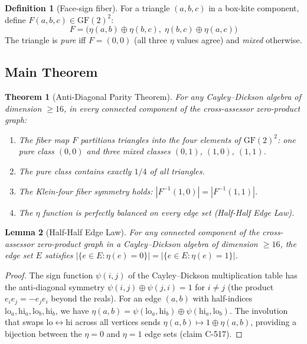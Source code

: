 \documentclass[12pt]{article}
\theoremstyle{definition}
\newtheorem{definition}{Definition}[section]
\theoremstyle{plain}
\newtheorem{theorem}{Theorem}[section]
\newtheorem{lemma}[theorem]{Lemma}
\theoremstyle{remark}
\begin{document}
\begin{definition}[Face-sign fiber]
For a triangle $(a,b,c)$ in a box-kite component, define
$F(a,b,c) \in \mathrm{GF}(2)^2$:
\begin{equation}
  F = \bigl(\eta(a,b) \oplus \eta(b,c),\;
            \eta(b,c) \oplus \eta(a,c)\bigr)
  \label{eq:fiber}
\end{equation}
The triangle is \emph{pure} iff $F = (0,0)$ (all three $\eta$ values agree)
and \emph{mixed} otherwise.
\end{definition}

\subsection{Main Theorem}
\label{sec:apt-main}

\begin{theorem}[Anti-Diagonal Parity Theorem]
\label{thm:apt}
For any Cayley--Dickson algebra of dimension $\geq 16$, in every connected
component of the cross-assessor zero-product graph:
\begin{enumerate}
  \item The fiber map $F$ partitions triangles into the four elements of
    $\mathrm{GF}(2)^2$: one pure class $(0,0)$ and three mixed classes
    $(0,1)$, $(1,0)$, $(1,1)$.
  \item The pure class contains exactly $1/4$ of all triangles.
  \item The Klein-four fiber symmetry holds: $|F^{-1}(1,0)| = |F^{-1}(1,1)|$.
  \item The $\eta$ function is perfectly balanced on every edge set
    (Half-Half Edge Law).
\end{enumerate}
\end{theorem}

\begin{lemma}[Half-Half Edge Law]
\label{lem:half-half}
For any connected component of the cross-assessor zero-product graph in a
Cayley--Dickson algebra of dimension $\geq 16$, the edge set $E$ satisfies
$|\{e \in E : \eta(e) = 0\}| = |\{e \in E : \eta(e) = 1\}|$.
\end{lemma}

\begin{proof}
The sign function $\psi(i,j)$ of the Cayley--Dickson multiplication table
has the anti-diagonal symmetry $\psi(i,j) \oplus \psi(j,i) = 1$ for
$i \neq j$ (the product $e_i e_j = -e_j e_i$ beyond the reals).  For an
edge $(a,b)$ with half-indices $\mathrm{lo}_a, \mathrm{hi}_a, \mathrm{lo}_b,
\mathrm{hi}_b$, we have
$\eta(a,b) = \psi(\mathrm{lo}_a, \mathrm{hi}_b) \oplus
\psi(\mathrm{hi}_a, \mathrm{lo}_b)$.
The involution that swaps $\mathrm{lo} \leftrightarrow \mathrm{hi}$ across
all vertices sends $\eta(a,b) \mapsto 1 \oplus \eta(a,b)$, providing a
bijection between the $\eta = 0$ and $\eta = 1$ edge sets (claim C-517).
\end{proof}
\end{document}
